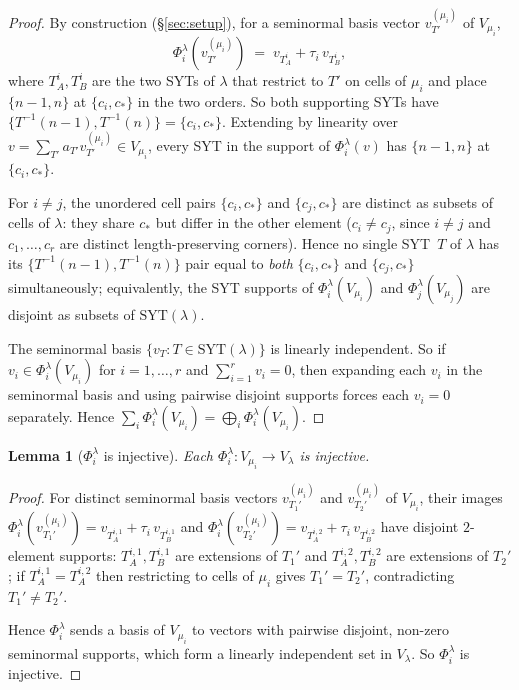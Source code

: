 \documentclass[11pt]{article}
\newtheorem{lemma}[theorem]{Lemma}
\theoremstyle{definition}
\begin{document}
\begin{proof}
By construction (\S\ref{sec:setup}), for a seminormal basis vector
$v_{T'}^{(\mu_i)}$ of $V_{\mu_i}$,
\[
   \Phi_i^\lambda(v_{T'}^{(\mu_i)})
   \;=\;
   v_{T_A^i} + \tau_i\, v_{T_B^i},
\]
where $T_A^i, T_B^i$ are the two SYTs of $\lambda$ that restrict to
$T'$ on cells of $\mu_i$ and place $\{n-1, n\}$ at $\{c_i, c_*\}$ in
the two orders. So both supporting SYTs have $\{T^{-1}(n-1), T^{-1}(n)\}
= \{c_i, c_*\}$. Extending by linearity over $v = \sum_{T'} a_{T'}
v_{T'}^{(\mu_i)} \in V_{\mu_i}$, every SYT in the support of
$\Phi_i^\lambda(v)$ has $\{n-1, n\}$ at $\{c_i, c_*\}$.

For $i \ne j$, the unordered cell pairs $\{c_i, c_*\}$ and
$\{c_j, c_*\}$ are distinct as subsets of cells of $\lambda$: they
share $c_*$ but differ in the other element ($c_i \ne c_j$, since
$i \ne j$ and $c_1, \ldots, c_r$ are distinct length-preserving
corners). Hence no single SYT~$T$ of $\lambda$ has its
$\{T^{-1}(n-1), T^{-1}(n)\}$ pair equal to \emph{both} $\{c_i, c_*\}$
and $\{c_j, c_*\}$ simultaneously; equivalently, the SYT supports of
$\Phi_i^\lambda(V_{\mu_i})$ and $\Phi_j^\lambda(V_{\mu_j})$ are
disjoint as subsets of $\mathrm{SYT}(\lambda)$.

The seminormal basis $\{v_T : T \in \mathrm{SYT}(\lambda)\}$ is
linearly independent. So if $v_i \in \Phi_i^\lambda(V_{\mu_i})$ for
$i = 1, \ldots, r$ and $\sum_{i=1}^r v_i = 0$, then expanding each
$v_i$ in the seminormal basis and using pairwise disjoint supports
forces each $v_i = 0$ separately. Hence
$\sum_i \Phi_i^\lambda(V_{\mu_i}) = \bigoplus_i \Phi_i^\lambda(V_{\mu_i})$.
\end{proof}

\begin{lemma}[$\Phi_i^\lambda$ is injective]\label{lem:phi-inj}
Each $\Phi_i^\lambda : V_{\mu_i} \to V_\lambda$ is injective.
\end{lemma}

\begin{proof}
For distinct seminormal basis vectors $v_{T_1'}^{(\mu_i)}$ and
$v_{T_2'}^{(\mu_i)}$ of $V_{\mu_i}$, their images
$\Phi_i^\lambda(v_{T_1'}^{(\mu_i)}) = v_{T_A^{i,1}} + \tau_i\, v_{T_B^{i,1}}$
and
$\Phi_i^\lambda(v_{T_2'}^{(\mu_i)}) = v_{T_A^{i,2}} + \tau_i\, v_{T_B^{i,2}}$
have disjoint $2$-element supports: $T_A^{i,1}, T_B^{i,1}$ are
extensions of $T_1'$ and $T_A^{i,2}, T_B^{i,2}$ are extensions of
$T_2'$; if $T_A^{i,1} = T_A^{i,2}$ then restricting to cells of
$\mu_i$ gives $T_1' = T_2'$, contradicting $T_1' \ne T_2'$.

Hence $\Phi_i^\lambda$ sends a basis of $V_{\mu_i}$ to vectors with
pairwise disjoint, non-zero seminormal supports, which form a
linearly independent set in $V_\lambda$. So $\Phi_i^\lambda$ is
injective.
\end{proof}
\end{document}
